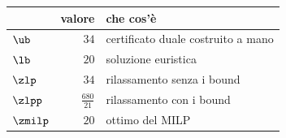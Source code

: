 \begin{center}\small
\begin{tabular}{lrl}
\toprule
 & valore & che cos'è \\
\midrule
$\ub$ & $34$ & certificato duale costruito a mano \\
$\lb$ & $20$ & soluzione euristica \\
$\zlp$ & $34$ & rilassamento senza i bound \\
$\zlpp$ & $\frac{680}{21}$ & rilassamento con i bound \\
$\zmilp$ & $20$ & ottimo del MILP \\
\bottomrule
\end{tabular}
\end{center}

